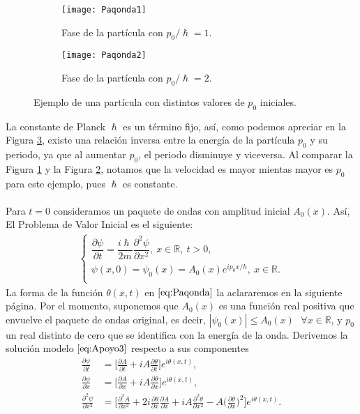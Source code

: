 \documentclass[12pt]{article}
\theoremstyle{definition}
\newcommand*{\field}[1]{\mathbb{#1}}
\begin{document}
\begin{figure}[h]
\begin{subfigure}{0.5\textwidth}
\texttt{[image: Paqonda1]}
\caption{Fase de la partícula con $p_{0}/\hslash = 1$.}
\label{fig:Particula1}
\end{subfigure}
\begin{subfigure}{0.5\textwidth}
\texttt{[image: Paqonda2]}
\caption{Fase de la partícula con $p_{0}/\hslash = 2$. }
\label{fig:Particula2}
\end{subfigure}
\caption{Ejemplo de una partícula con distintos valores de $p_{0}$ iniciales.}
\label{fig:Part}
\end{figure}
\noindent
La constante de Planck $\hslash$ es un término fijo, así, como podemos apreciar en la Figura \ref{fig:Part}, existe una relación inversa entre la energía de la partícula $p_{0}$ y su periodo, ya que al aumentar $p_{0}$, el periodo disminuye y viceversa. Al comparar la Figura \ref{fig:Particula1} y la Figura \ref{fig:Particula2}, notamos que la velocidad es mayor mientas mayor es $p_{0}$ para este ejemplo, pues $\hslash$ es constante.
\\
\\
Para $t=0$ consideramos un paquete de ondas con amplitud inicial $A_{0}(x)$. Así, El Problema de Valor Inicial es el siguiente:
\begin{align}
         \left\{ \begin{array}{ll}
         \dfrac{\partial\psi}{\partial t} = \dfrac{i\hslash}{2m}\dfrac{\partial^2\psi}{\partial x^2} , \:x\in\field{R}, \:t>0,\\
         \psi(x,0) = \psi_{0}(x) = A_{0}(x)e^{ip_{0}x/h}, \:x\in\field{R}. \\
         \end{array} \label{eq:Paqonda}
\right.
    \end{align}
La forma de la función $\theta(x,t)$ en $\eqref{eq:Paqonda}$ la aclararemos en la siguiente página. Por el momento, suponemos que $A_{0}(x)$ es una función real positiva que envuelve el paquete de ondas original, es decir, $|\psi_{0}(x)|\leq A_{0}(x)\:\:\: \forall x\in\field{R}$, y $p_{0}$ un real distinto de cero que se identifica con la energía de la onda. Derivemos la solución modelo $\eqref{eq:Apoyo3}$ respecto a sus componentes
\begin{align*}
    \frac{\partial\psi}{\partial t} & = \bigg[\frac{\partial A}{\partial t} + iA\frac{\partial\theta}{\partial t}\bigg]e^{i\theta(x,t)},
    \\
    \frac{\partial\psi}{\partial x}  & = \bigg[\frac{\partial A}{\partial x} + iA\frac{\partial\theta}{\partial x}\bigg]e^{i\theta(x,t)},
    \\
    \frac{\partial^2\psi}{\partial x^2}  & = \bigg[\frac{\partial^2 A}{\partial x^2} + 2i\frac{\partial\theta}{\partial x}\frac{\partial A}{\partial x}  +
    iA\frac{\partial^2 \theta}{\partial x^2} - A\bigg(\frac{\partial\theta}{\partial x}\bigg)^2\bigg]e^{i\theta(x,t)}.
\end{align*}
\end{document}
